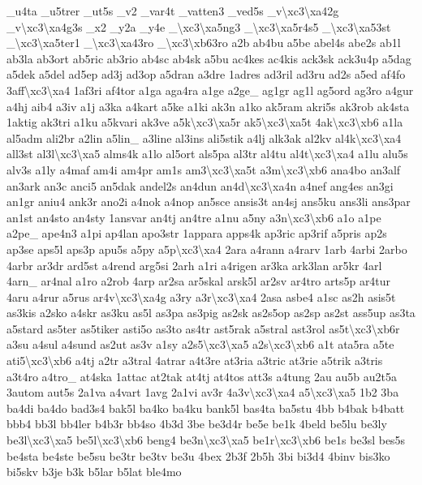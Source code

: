 \begin{DoxyCompactItemize}
\-\_\-u4ta \-\_\-u5trer \-\_\-ut5s \-\_\-v2 \-\_\-var4t \-\_\-vatten3 \-\_\-ved5s \-\_\-v\textbackslash{}xc3\textbackslash{}xa42g \-\_\-v\textbackslash{}xc3\textbackslash{}xa4g3s \-\_\-x2 \-\_\-y2a \-\_\-y4e \-\_\-\textbackslash{}xc3\textbackslash{}xa5ng3 \-\_\-\textbackslash{}xc3\textbackslash{}xa5r4s5 \-\_\-\textbackslash{}xc3\textbackslash{}xa53st \-\_\-\textbackslash{}xc3\textbackslash{}xa5ter1 \-\_\-\textbackslash{}xc3\textbackslash{}xa43ro \-\_\-\textbackslash{}xc3\textbackslash{}xb63ro a2b ab4bu a5be abel4s abe2s ab1l ab3la ab3ort ab5ric ab3rio ab4sc ab4sk a5bu ac4kes ac4kis ack3sk ack3u4p a5dag a5dek a5del ad5ep ad3j ad3op a5dran a3dre 1adres ad3ril ad3ru ad2s a5ed af4fo 3aff\textbackslash{}xc3\textbackslash{}xa4 1af3ri af4tor a1ga aga4ra a1ge a2ge\-\_\- ag1gr ag1l ag5ord ag3ro a4gur a4hj aib4 a3iv a1j a3ka a4kart a5ke a1ki ak3n a1ko ak5ram akri5s ak3rob ak4sta 1aktig ak3tri a1ku a5kvari ak3ve a5k\textbackslash{}xc3\textbackslash{}xa5r ak5\textbackslash{}xc3\textbackslash{}xa5t 4ak\textbackslash{}xc3\textbackslash{}xb6 a1la al5adm ali2br a2lin a5lin\-\_\- a3line al3ins ali5stik a4lj alk3ak al2kv al4k\textbackslash{}xc3\textbackslash{}xa4 all3st al3l\textbackslash{}xc3\textbackslash{}xa5 alms4k a1lo al5ort als5pa al3tr al4tu al4t\textbackslash{}xc3\textbackslash{}xa4 a1lu alu5s alv3s a1ly a4maf am4i am4pr am1s am3\textbackslash{}xc3\textbackslash{}xa5t a3m\textbackslash{}xc3\textbackslash{}xb6 ana4bo an3alf an3ark an3c anci5 an5dak andel2s an4dun an4d\textbackslash{}xc3\textbackslash{}xa4n a4nef ang4es an3gi an1gr aniu4 ank3r ano2i a4nok a4nop an5sce ansis3t an4sj ans5ku ans3li ans3par an1st an4sto an4sty 1ansvar an4tj an4tre a1nu a5ny a3n\textbackslash{}xc3\textbackslash{}xb6 a1o a1pe a2pe\-\_\- ape4n3 a1pi ap4lan apo3str 1appara apps4k ap3ric ap3rif a5pris ap2s ap3se aps5l aps3p apu5s a5py a5p\textbackslash{}xc3\textbackslash{}xa4 2ara a4rann a4rarv 1arb 4arbi 2arbo 4arbr ar3dr ard5st a4rend arg5si 2arh a1ri a4rigen ar3ka ark3lan ar5kr 4arl 4arn\-\_\- ar4nal a1ro a2rob 4arp ar2sa ar5skal arsk5l ar2sv ar4tro arts5p ar4tur 4aru a4rur a5rus ar4v\textbackslash{}xc3\textbackslash{}xa4g a3ry a3r\textbackslash{}xc3\textbackslash{}xa4 2asa asbe4 a1sc as2h asis5t as3kis a2sko a4skr as3ku as5l as3pa as3pig as2sk as2s5op as2sp as2st ass5up as3ta a5stard as5ter as5tiker asti5o as3to as4tr ast5rak a5stral ast3rol as5t\textbackslash{}xc3\textbackslash{}xb6r a3su a4sul a4sund as2ut as3v a1sy a2s5\textbackslash{}xc3\textbackslash{}xa5 a2s\textbackslash{}xc3\textbackslash{}xb6 a1t ata5ra a5te ati5\textbackslash{}xc3\textbackslash{}xb6 a4tj a2tr a3tral 4atrar a4t3re at3ria a3tric at3rie a5trik a3tris a3t4ro a4tro\-\_\- at4ska 1attac at2tak at4tj at4tos att3s a4tung 2au au5b au2t5a 3autom aut5s 2a1va a4vart 1avg 2a1vi av3r 4a3v\textbackslash{}xc3\textbackslash{}xa4 a5\textbackslash{}xc3\textbackslash{}xa5 1b2 3ba ba4di ba4do bad3s4 bak5l ba4ko ba4ku bank5l bas4ta ba5stu 4bb b4bak b4batt bbb4 bb3l bb4ler b4b3r bb4so 4b3d 3be be3d4r be5e be1k 4beld be5lu be3ly be3l\textbackslash{}xc3\textbackslash{}xa5 be5l\textbackslash{}xc3\textbackslash{}xb6 beng4 be3n\textbackslash{}xc3\textbackslash{}xa5 be1r\textbackslash{}xc3\textbackslash{}xb6 be1s be3sl bes5s be4sta be4ste be5su be3tr be3tv be3u 4bex 2b3f 2b5h 3bi bi3d4 4binv bis3ko bi5skv b3je b3k b5lar b5lat ble4mo 
\end{DoxyCompactItemize}
